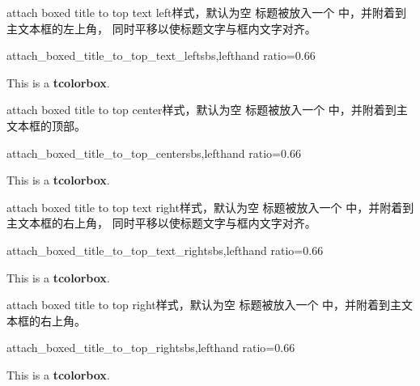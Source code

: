 \begin{docTcbKey}[][doc new=2021-07-30]{attach boxed title to top text left}{}{样式，默认为空}
标题被放入一个  中，并附着到主文本框的左上角，
同时平移以使标题文字与框内文字对齐。
\begin{exdispExample*}{attach_boxed_title_to_top_text_left}{sbs,lefthand ratio=0.66}
\begin{tcolorbox}[enhanced,title=My title,
  attach boxed title to top text left]
  This is a \textbf{tcolorbox}.
\end{tcolorbox}
\end{exdispExample*}
\end{docTcbKey}

\begin{docTcbKey}{attach boxed title to top center}{}{样式，默认为空}
标题被放入一个  中，并附着到主文本框的顶部。
\begin{exdispExample*}{attach_boxed_title_to_top_center}{sbs,lefthand ratio=0.66}
\begin{tcolorbox}[enhanced,title=My title,
  attach boxed title to top center]
  This is a \textbf{tcolorbox}.
\end{tcolorbox}
\end{exdispExample*}
\end{docTcbKey}

\begin{docTcbKey}[][doc new=2021-07-30]{attach boxed title to top text right}{}{样式，默认为空}
标题被放入一个  中，并附着到主文本框的右上角，
同时平移以使标题文字与框内文字对齐。
\begin{exdispExample*}{attach_boxed_title_to_top_text_right}{sbs,lefthand ratio=0.66}
\begin{tcolorbox}[enhanced,title=My title,
  halign=right,
  attach boxed title to top text right]
  This is a \textbf{tcolorbox}.
\end{tcolorbox}
\end{exdispExample*}
\end{docTcbKey}


\begin{docTcbKey}{attach boxed title to top right}{}{样式，默认为空}
标题被放入一个  中，并附着到主文本框的右上角。
\begin{exdispExample*}{attach_boxed_title_to_top_right}{sbs,lefthand ratio=0.66}
\begin{tcolorbox}[enhanced,title=My title,
  attach boxed title to top right]
  This is a \textbf{tcolorbox}.
\end{tcolorbox}
\end{exdispExample*}
\end{docTcbKey}

